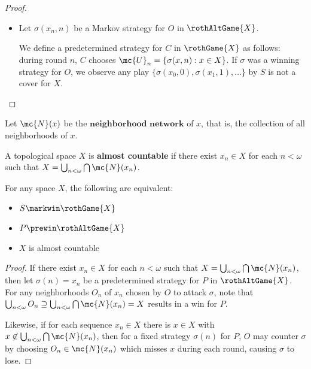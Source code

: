 \begin{proof}
\begin{itemize}
      \item
      Let $\sigma(x_n,n)$ be a Markov strategy for $O$ in $\rothAltGame{X}$.

      We define a predetermined strategy for $C$ in $\rothGame{X}$ as follows: during round $n$, $C$ chooses $\mc{U}_n = \{\sigma(x,n) : x\in X\}$. If $\sigma$ was a winning strategy for $O$, we observe any play $\{\sigma(x_0,0),\sigma(x_1,1),\dots\}$ by $S$ is not a cover for $X$.

    \end{itemize}

  \end{proof}

  \begin{defn}
    Let $\mc{N}(x)$ be the $\textbf{neighborhood network}$ of $x$, that is, the collection of all neighborhoods of $x$.
  \end{defn}

  \begin{defn}
    A topological space $X$ is \textbf{almost countable} if there exist $x_n\in X$ for each $n<\omega$ such that $X=\bigcup_{n<\omega}\bigcap\mc{N}(x_n)$.
  \end{defn}

  \begin{thm}
    For any space $X$, the following are equivalent:
    \begin{itemize}
      \item $S\markwin\rothGame{X}$
      \item $P\prewin\rothAltGame{X}$
      \item $X$ is almost countable
    \end{itemize}
  \end{thm}

  \begin{proof}
    If there exist $x_n\in X$ for each $n<\omega$ such that $X=\bigcup_{n<\omega}\bigcap\mc{N}(x_n)$, then let $\sigma(n)=x_n$ be a predetermined strategy for $P$ in $\rothAltGame{X}$. For any neighborhoods $O_n$ of $x_n$ chosen by $O$ to attack $\sigma$, note that $\bigcup_{n<\omega}O_n\supseteq\bigcup_{n<\omega}\bigcap\mc{N}(x_n)=X$ results in a win for $P$.

    Likewise, if for each sequence $x_n \in X$ there is $x\in X$ with $x\not\in \bigcup_{n<\omega}\bigcap\mc{N}(x_n)$, then for a fixed strategy $\sigma(n)$ for $P$, $O$ may counter $\sigma$ by choosing $O_n\in\mc{N}(x_n)$ which misses $x$ during each round, causing $\sigma$ to lose.
  \end{proof}

